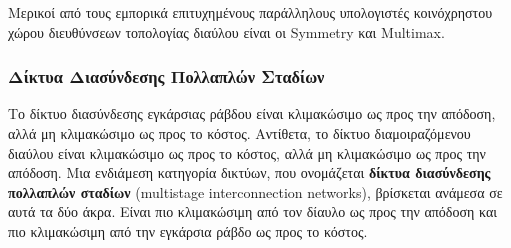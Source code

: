 \documentclass[12pt,a4paper]{article}
\begin{document}
{\sloppy
Μερικοί από τους εμπορικά επιτυχημένους παράλληλους υπολογιστές 
κοινόχρηστου χώρου διευθύνσεων τοπολογίας διαύλου είναι οι 
\foreignlanguage{english}{Symmetry} και 
\foreignlanguage{english}{Multimax}.
\par
}

\subsubsection{Δίκτυα Διασύνδεσης Πολλαπλών Σταδίων}
Το δίκτυο διασύνδεσης εγκάρσιας ράβδου είναι κλιμακώσιμο ως προς την 
απόδοση, αλλά μη κλιμακώσιμο ως προς το κόστος. Αντίθετα, το δίκτυο 
διαμοιραζόμενου διαύλου είναι 
κλιμακώσιμο ως προς το κόστος, αλλά μη κλιμακώσιμο ως προς την απόδοση. 
Μια ενδιάμεση κατηγορία δικτύων, που ονομάζεται \textbf{δίκτυα διασύνδεσης 
πολλαπλών σταδίων} (\foreignlanguage{english}{multistage interconnection 
networks}), βρίσκεται ανάμεσα σε αυτά τα δύο άκρα. Είναι πιο κλιμακώσιμη 
από τον δίαυλο ως προς την απόδοση και πιο κλιμακώσιμη από την εγκάρσια 
ράβδο ως προς το κόστος.
\end{document}
